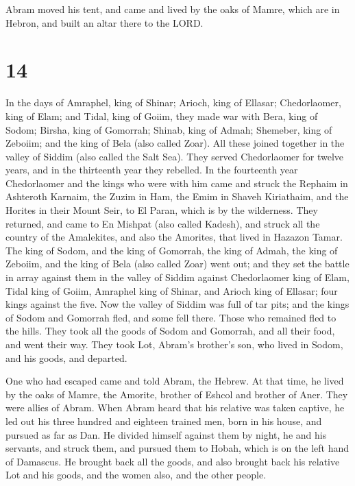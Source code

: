  Abram moved his tent, and came and lived by the oaks of
Mamre, which are in Hebron, and built an altar there to the LORD.

\hypertarget{section-13}{%
\section{14}\label{section-13}}

 In the days of Amraphel, king of Shinar; Arioch, king of
Ellasar; Chedorlaomer, king of Elam; and Tidal, king of Goiim,
 they made war with Bera, king of Sodom; Birsha, king of
Gomorrah; Shinab, king of Admah; Shemeber, king of Zeboiim; and the king
of Bela (also called Zoar).  All these joined together in
the valley of Siddim (also called the Salt Sea).  They
served Chedorlaomer for twelve years, and in the thirteenth year they
rebelled.  In the fourteenth year Chedorlaomer and the
kings who were with him came and struck the Rephaim in Ashteroth
Karnaim, the Zuzim in Ham, the Emim in Shaveh Kiriathaim, 
and the Horites in their Mount Seir, to El Paran, which is by the
wilderness.  They returned, and came to En Mishpat (also
called Kadesh), and struck all the country of the Amalekites, and also
the Amorites, that lived in Hazazon Tamar.  The king of
Sodom, and the king of Gomorrah, the king of Admah, the king of Zeboiim,
and the king of Bela (also called Zoar) went out; and they set the
battle in array against them in the valley of Siddim 
against Chedorlaomer king of Elam, Tidal king of Goiim, Amraphel king of
Shinar, and Arioch king of Ellasar; four kings against the five.
 Now the valley of Siddim was full of tar pits; and the
kings of Sodom and Gomorrah fled, and some fell there. Those who
remained fled to the hills.  They took all the goods of
Sodom and Gomorrah, and all their food, and went their way.
 They took Lot, Abram's brother's son, who lived in
Sodom, and his goods, and departed.

 One who had escaped came and told Abram, the Hebrew. At
that time, he lived by the oaks of Mamre, the Amorite, brother of Eshcol
and brother of Aner. They were allies of Abram.  When
Abram heard that his relative was taken captive, he led out his three
hundred and eighteen trained men, born in his house, and pursued as far
as Dan.  He divided himself against them by night, he and
his servants, and struck them, and pursued them to Hobah, which is on
the left hand of Damascus.  He brought back all the
goods, and also brought back his relative Lot and his goods, and the
women also, and the other people.

